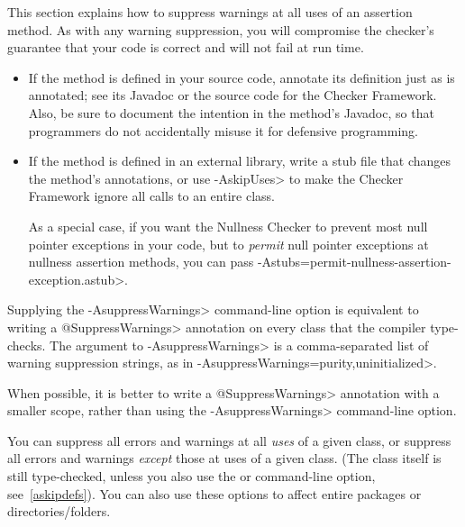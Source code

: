 This section explains how to suppress warnings at all uses of an assertion
method.  As with any warning suppression, you will compromise the checker's
guarantee that your code is correct and will not fail at run time.

\begin{itemize}
\item
  If the method is defined in your source code, annotate its definition just as
   is
  annotated; see its Javadoc or the source code for the Checker Framework.
  Also, be sure to document the intention in the method's Javadoc, so that
  programmers do not
  accidentally misuse it for defensive programming.
\item
  If the method is defined in an external library, write a stub file that
  changes the method's annotations, or use \<-AskipUses> to make the
  Checker Framework ignore all calls to an entire class.

  As a special case, if you want the Nullness Checker to prevent most null
  pointer exceptions in your code, but to \emph{permit} null pointer
  exceptions at nullness assertion methods, you can pass
  \<-Astubs=permit-nullness-assertion-exception.astub>.
\end{itemize}



Supplying the \<-AsuppressWarnings> command-line option is equivalent to
writing a \<@SuppressWarnings> annotation on every class that the compiler
type-checks.  The argument to \<-AsuppressWarnings> is a comma-separated
list of warning suppression strings, as in
\<-AsuppressWarnings=purity,uninitialized>.

When possible, it is better to write a \<@SuppressWarnings> annotation with a
smaller scope, rather than using the \<-AsuppressWarnings> command-line option.



You can suppress all errors and warnings at all \emph{uses} of a given
class, or suppress all errors and warnings \emph{except} those at uses of a given
class.  (The class itself is still type-checked, unless you also use
the  or  command-line option, see~\ref{askipdefs}).
You can also use these options to affect entire packages or directories/folders.

